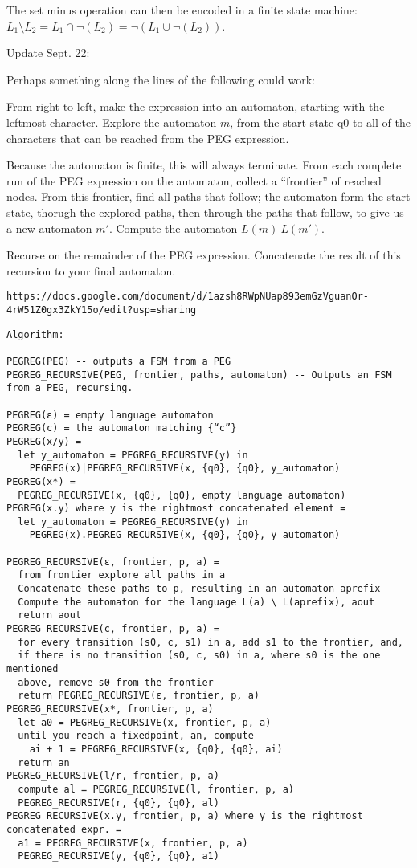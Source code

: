 \documentclass[10pt]{article}
\begin{document}
The set minus operation can then be encoded in a finite state machine: $L_1 \setminus L_2 = L_1 \cap \neg(L_2) = \neg(L_1 \cup \neg(L_2))$.

Update Sept. 22:

Perhaps something along the lines of the following could work:

From right to left, make the expression into an automaton, starting with the leftmost character. Explore
the automaton $m$, from the start state q0 to all of the characters that can be reached from the PEG expression.

Because the automaton is finite, this will always terminate. From each complete run of the PEG expression on
the automaton, collect a ``frontier'' of reached nodes. From this frontier, find all paths that follow; the
automaton form the start state, thorugh the explored paths, then through the paths that follow, to
give us a new automaton $m\prime$. Compute the automaton $L(m) \ L(m\prime)$.

Recurse on the remainder of the PEG expression. Concatenate the result of this recursion to your final automaton.
\begin{verbatim}
https://docs.google.com/document/d/1azsh8RWpNUap893emGzVguanOr-4rW51Z0gx3ZkY15o/edit?usp=sharing
\end{verbatim}

\begin{verbatim}
Algorithm:

PEGREG(PEG) -- outputs a FSM from a PEG
PEGREG_RECURSIVE(PEG, frontier, paths, automaton) -- Outputs an FSM from a PEG, recursing.

PEGREG(ε) = empty language automaton
PEGREG(c) = the automaton matching {“c”}
PEGREG(x/y) =
  let y_automaton = PEGREG_RECURSIVE(y) in
    PEGREG(x)|PEGREG_RECURSIVE(x, {q0}, {q0}, y_automaton)
PEGREG(x*) =
  PEGREG_RECURSIVE(x, {q0}, {q0}, empty language automaton)
PEGREG(x.y) where y is the rightmost concatenated element =
  let y_automaton = PEGREG_RECURSIVE(y) in
    PEGREG(x).PEGREG_RECURSIVE(x, {q0}, {q0}, y_automaton)

PEGREG_RECURSIVE(ε, frontier, p, a) = 
  from frontier explore all paths in a
  Concatenate these paths to p, resulting in an automaton aprefix
  Compute the automaton for the language L(a) \ L(aprefix), aout
  return aout
PEGREG_RECURSIVE(c, frontier, p, a) = 
  for every transition (s0, c, s1) in a, add s1 to the frontier, and,
  if there is no transition (s0, c, s0) in a, where s0 is the one mentioned
  above, remove s0 from the frontier
  return PEGREG_RECURSIVE(ε, frontier, p, a)
PEGREG_RECURSIVE(x*, frontier, p, a)
  let a0 = PEGREG_RECURSIVE(x, frontier, p, a)
  until you reach a fixedpoint, an, compute
    ai + 1 = PEGREG_RECURSIVE(x, {q0}, {q0}, ai)
  return an
PEGREG_RECURSIVE(l/r, frontier, p, a)
  compute al = PEGREG_RECURSIVE(l, frontier, p, a)
  PEGREG_RECURSIVE(r, {q0}, {q0}, al)
PEGREG_RECURSIVE(x.y, frontier, p, a) where y is the rightmost concatenated expr. = 
  a1 = PEGREG_RECURSIVE(x, frontier, p, a)
  PEGREG_RECURSIVE(y, {q0}, {q0}, a1)
\end{verbatim}
\end{document}
